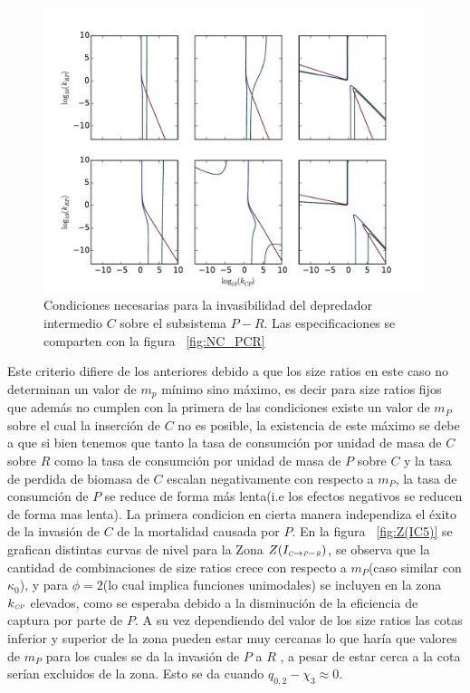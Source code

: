 \begin{figure}
  \centering
  \includegraphics[width = 0.99\textwidth]{./Plots/NecessityCPR.pdf}
  \caption[Condiciones Necesarias $C \to P-R$]{Condiciones necesarias para la invasibilidad del depredador intermedio $C$ sobre el subsistema $P-R$. Las especificaciones se comparten con la figura ~\ref{fig:NC_PCR}}
  \label{fig:NC_CPR}
\end{figure}


Este criterio difiere de los anteriores debido a que los size ratios en este caso no determinan un valor de $m_p$ m\'inimo sino m\'aximo, es decir para size ratios fijos que adem\'as no cumplen con la primera de las condiciones existe un valor de $m_P$ sobre el cual la inserci\'on de $C$ no es posible, la existencia de este m\'aximo se debe a que si bien tenemos que tanto la tasa de consumci\'on por unidad de masa de $C$ sobre $R$ como la tasa de consumci\'on por unidad de masa de $P$ sobre $C$ y la tasa de perdida de biomasa de $C$ escalan negativamente con respecto a $m_P$, la tasa de consumci\'on de $P$ se reduce de forma m\'as lenta(i.e los efectos negativos se reducen de forma mas lenta). La primera condicion en cierta manera independiza el \'exito de la invasi\'on de $C$ de la mortalidad causada por $P$. En la figura ~\ref{fig:Z(IC5)} se grafican distintas curvas de nivel para la Zona $Z(I_{\textit{\tiny C} \to \textit{\tiny P}-\textit{\tiny R}})$, se observa que la cantidad de combinaciones de size ratios crece con respecto a $m_P$(caso similar con $\kappa_0$), y para $\phi = 2$(lo cual implica funciones unimodales) se incluyen en la zona $k_{\textit{\tiny CP}}$ elevados, como se esperaba debido a la disminuci\'on de la eficiencia de captura por parte de $P$. A su vez dependiendo del valor de los size ratios las cotas inferior y superior de la zona pueden estar muy cercanas lo que har\'ia que valores de $m_P$ para los cuales se da la invasi\'on de $P$ a $R$ , a pesar de estar cerca a la cota ser\'ian excluidos de la zona. Esto se da cuando $ q_{0,2} - \chi_3 \approx 0$.


